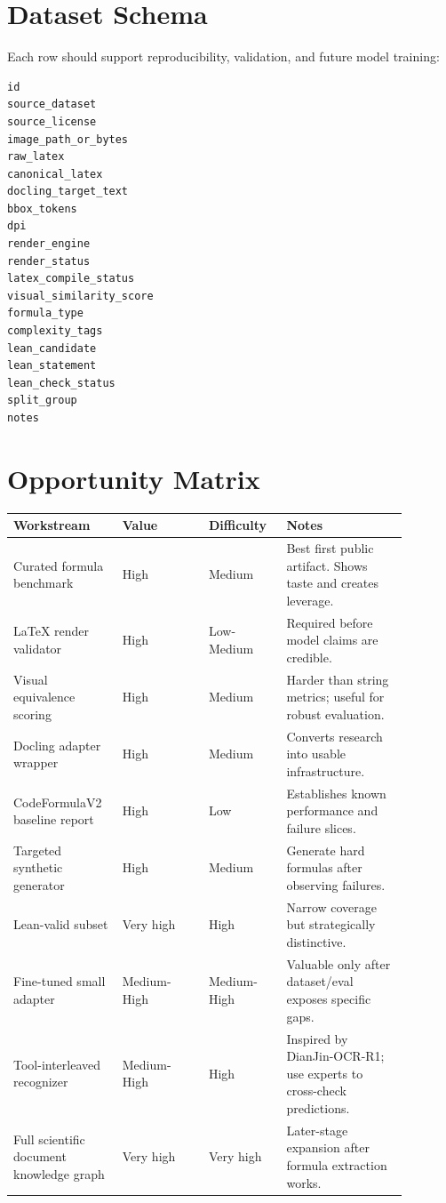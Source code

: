 \documentclass[11pt]{article}
\begin{document}
\section{Dataset Schema}

Each row should support reproducibility, validation, and future model training:

\begin{verbatim}
id
source_dataset
source_license
image_path_or_bytes
raw_latex
canonical_latex
docling_target_text
bbox_tokens
dpi
render_engine
render_status
latex_compile_status
visual_similarity_score
formula_type
complexity_tags
lean_candidate
lean_statement
lean_check_status
split_group
notes
\end{verbatim}

\section{Opportunity Matrix}

\begin{longtable}{p{0.22\linewidth} p{0.2\linewidth} p{0.18\linewidth} p{0.28\linewidth}}
\toprule
\textbf{Workstream} & \textbf{Value} & \textbf{Difficulty} & \textbf{Notes} \\
\midrule
Curated formula benchmark & High & Medium & Best first public artifact. Shows taste and creates leverage. \\
LaTeX render validator & High & Low-Medium & Required before model claims are credible. \\
Visual equivalence scoring & High & Medium & Harder than string metrics; useful for robust evaluation. \\
Docling adapter wrapper & High & Medium & Converts research into usable infrastructure. \\
CodeFormulaV2 baseline report & High & Low & Establishes known performance and failure slices. \\
Targeted synthetic generator & High & Medium & Generate hard formulas after observing failures. \\
Lean-valid subset & Very high & High & Narrow coverage but strategically distinctive. \\
Fine-tuned small adapter & Medium-High & Medium-High & Valuable only after dataset/eval exposes specific gaps. \\
Tool-interleaved recognizer & Medium-High & High & Inspired by DianJin-OCR-R1; use experts to cross-check predictions. \\
Full scientific document knowledge graph & Very high & Very high & Later-stage expansion after formula extraction works. \\
\bottomrule
\end{longtable}
\end{document}
